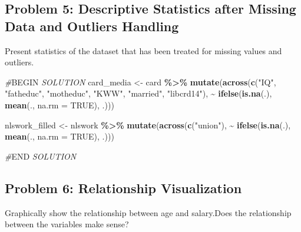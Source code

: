 \documentclass[
]{article}
\newenvironment{Shaded}{\begin{snugshade}}{\end{snugshade}}
\newcommand{\AttributeTok}[1]{\textcolor[rgb]{0.13,0.29,0.53}{#1}}
\newcommand{\CommentTok}[1]{\textcolor[rgb]{0.56,0.35,0.01}{\textit{#1}}}
\newcommand{\ConstantTok}[1]{\textcolor[rgb]{0.56,0.35,0.01}{#1}}
\newcommand{\FunctionTok}[1]{\textcolor[rgb]{0.13,0.29,0.53}{\textbf{#1}}}
\newcommand{\NormalTok}[1]{#1}
\newcommand{\OtherTok}[1]{\textcolor[rgb]{0.56,0.35,0.01}{#1}}
\newcommand{\RegionMarkerTok}[1]{#1}
\newcommand{\SpecialCharTok}[1]{\textcolor[rgb]{0.81,0.36,0.00}{\textbf{#1}}}
\newcommand{\StringTok}[1]{\textcolor[rgb]{0.31,0.60,0.02}{#1}}
\begin{document}
\hypertarget{problem-5-descriptive-statistics-after-missing-data-and-outliers-handling}{%
\subsection{Problem 5: Descriptive Statistics after Missing Data and
Outliers
Handling}\label{problem-5-descriptive-statistics-after-missing-data-and-outliers-handling}}

Present statistics of the dataset that has been treated for missing
values and outliers.

\begin{Shaded}
\begin{Highlighting}[]
\CommentTok{\#}\RegionMarkerTok{BEGIN}\CommentTok{ SOLUTION}
\NormalTok{card\_media }\OtherTok{\textless{}{-}}\NormalTok{ card }\SpecialCharTok{\%\textgreater{}\%}
  \FunctionTok{mutate}\NormalTok{(}\FunctionTok{across}\NormalTok{(}\FunctionTok{c}\NormalTok{(}\StringTok{"IQ"}\NormalTok{, }\StringTok{"fatheduc"}\NormalTok{, }\StringTok{"motheduc"}\NormalTok{, }\StringTok{"KWW"}\NormalTok{, }\StringTok{"married"}\NormalTok{, }\StringTok{"libcrd14"}\NormalTok{),}
                \SpecialCharTok{\textasciitilde{}} \FunctionTok{ifelse}\NormalTok{(}\FunctionTok{is.na}\NormalTok{(.), }\FunctionTok{mean}\NormalTok{(., }\AttributeTok{na.rm =} \ConstantTok{TRUE}\NormalTok{), .))) }

\NormalTok{nlswork\_filled }\OtherTok{\textless{}{-}}\NormalTok{ nlswork }\SpecialCharTok{\%\textgreater{}\%} 
  \FunctionTok{mutate}\NormalTok{(}\FunctionTok{across}\NormalTok{(}\FunctionTok{c}\NormalTok{(}\StringTok{"union"}\NormalTok{), }\SpecialCharTok{\textasciitilde{}} \FunctionTok{ifelse}\NormalTok{(}\FunctionTok{is.na}\NormalTok{(.), }\FunctionTok{mean}\NormalTok{(., }\AttributeTok{na.rm =} \ConstantTok{TRUE}\NormalTok{), .))) }

\CommentTok{\#}\RegionMarkerTok{END}\CommentTok{ SOLUTION}
\end{Highlighting}
\end{Shaded}

\hypertarget{problem-6-relationship-visualization}{%
\subsection{Problem 6: Relationship
Visualization}\label{problem-6-relationship-visualization}}

Graphically show the relationship between age and salary.Does the
relationship between the variables make sense?
\end{document}
